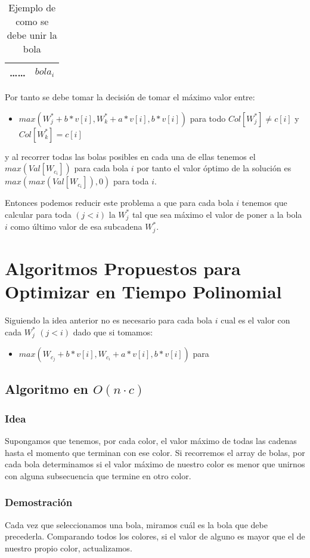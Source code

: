 \documentclass{article}
\begin{document}
\begin{table}
    \centering
    \begin{tabular}{|c|c|}
        \hline
        \dots \dots & $bola_i$\\
        \hline
    \end{tabular}
    \caption{Ejemplo de como se debe unir la bola}
\end{table}

Por tanto se debe tomar la decisión de tomar el máximo valor entre:
\begin{itemize}
    \item $max(W_j^*+b*v[i],W_k^*+a*v[i],b*v[i])$ para todo  $Col[W_j^*] \neq c[i] $ y  $Col[W_k^*] = c[i] $
\end{itemize}
y al recorrer todas las bolas posibles en cada una de ellas tenemos el $max(Val[W_{c_i}])$  para cada bola $i$
por tanto el valor óptimo de la solución es $max(max(Val[W_{c_i}]),0)$ para toda $i$.

Entonces podemos reducir este problema a que para cada bola $i$ tenemos que calcular para toda $(j<i)$ la  $W_j^*$
tal que sea máximo el valor de poner a la bola $i$ como último valor de esa subcadena  $W_j^*$.


\section*{Algoritmos Propuestos para Optimizar en Tiempo Polinomial}
Siguiendo la idea anterior no es necesario para cada bola $i$ cual es el valor con cada  $W_j^*$ $(j<i)$ dado que si tomamos:
\begin{itemize}
     \item $max(W_{c_j}+b*v[i],W_{c_i}+a*v[i],b*v[i])$ para 
\end{itemize}


\subsection*{Algoritmo en $O(n \cdot c)$}
\subsubsection*{Idea}
Supongamos que tenemos, por cada color, el valor máximo de todas las cadenas hasta el momento que terminan con ese color. Si recorremos el array de bolas, por cada bola determinamos si el valor máximo de nuestro color es menor que unirnos con alguna subsecuencia que termine en otro color.

\subsubsection*{Demostración}
Cada vez que seleccionamos una bola, miramos cuál es la bola que debe precederla. Comparando todos los colores, si el valor de alguno es mayor que el de nuestro propio color, actualizamos.
\end{document}
